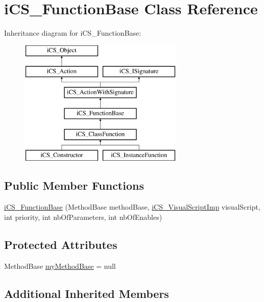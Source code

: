 \hypertarget{classi_c_s___function_base}{\section{i\+C\+S\+\_\+\+Function\+Base Class Reference}
\label{classi_c_s___function_base}
}
Inheritance diagram for i\+C\+S\+\_\+\+Function\+Base\+:\begin{figure}[H]
\begin{center}
\leavevmode
\includegraphics[height=6.000000cm]{classi_c_s___function_base}
\end{center}
\end{figure}
\subsection*{Public Member Functions}
\begin{DoxyCompactItemize}
\item 
\hyperlink{classi_c_s___function_base_a64fe56be4d22d6b383d41c43e2314a88}{i\+C\+S\+\_\+\+Function\+Base} (Method\+Base method\+Base, \hyperlink{classi_c_s___visual_script_imp}{i\+C\+S\+\_\+\+Visual\+Script\+Imp} visual\+Script, int priority, int nb\+Of\+Parameters, int nb\+Of\+Enables)
\end{DoxyCompactItemize}
\subsection*{Protected Attributes}
\begin{DoxyCompactItemize}
\item 
Method\+Base \hyperlink{classi_c_s___function_base_ab1cc13ae2c715a843759e0c34e7275d3}{my\+Method\+Base} = null
\end{DoxyCompactItemize}
\subsection*{Additional Inherited Members}


